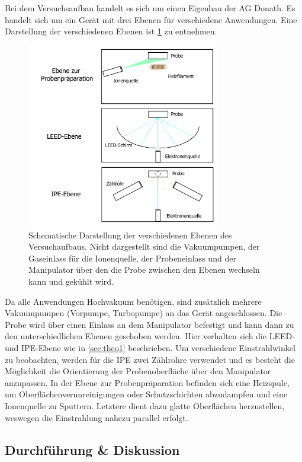Bei dem Versuchsaufbau handelt es sich um einen Eigenbau der AG Donath.
Es handelt sich um ein Gerät mit drei Ebenen für verschiedene Anwendungen.
Eine Darstellung der verschiedenen Ebenen ist \cref{fig_ipe_setup} zu entnehmen.
\begin{figure}[!ht]
    \centering
    \includegraphics[width=0.75\textwidth]{img/setup1.png}
    \caption{Schematische Darstellung der verschiedenen Ebenen des Versuchaufbaus.
    Nicht dargestellt sind die Vakuumpumpen, der Gaseinlass für die Ionenquelle, der Probeneinlass und der Manipulator über den die Probe zwischen den Ebenen wechseln kann und gekühlt wird.}
    \label{fig_ipe_setup}
\end{figure}
Da alle Anwendungen Hochvakuum benötigen, sind zusätzlich mehrere Vakuumpumpen (Vorpumpe, Turbopumpe) an das Gerät angeschlossen.
Die Probe wird über einen Einlass an dem Manipulator befestigt und kann dann zu den unterschiedlichen Ebenen geschoben werden.
Hier verhalten sich die LEED- und IPE-Ebene wie in \cref{sec:theo1} beschrieben.
Um verschiedene Einstrahlwinkel zu beobachten, werden für die IPE zwei Zählrohre verwendet und es besteht die Möglichkeit die Orientierung der Probenoberfläche über den Manipulator anzupassen.
In der Ebene zur Probenpräparation befinden sich eine Heizspule, um Oberflächenverunreinigungen oder Schutzschichten abzudampfen und eine Ionenquelle zu Sputtern.
Letztere dient dazu glatte Oberflächen herzustellen, weswegen die Einstrahlung nahezu parallel erfolgt.

\subsection{Durchführung \& Diskussion}

